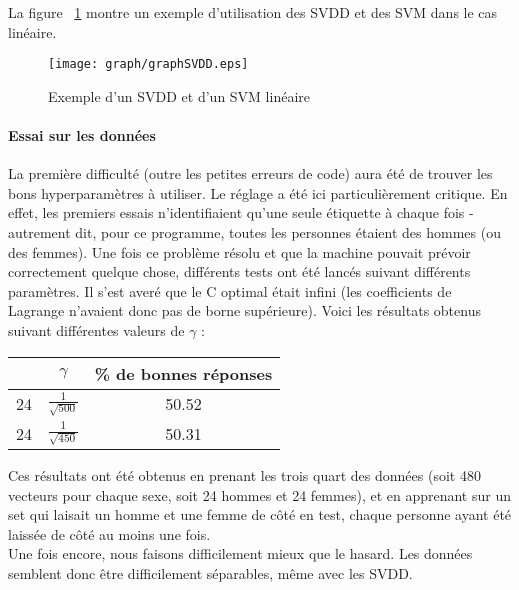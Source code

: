 La figure ~\ref{figSVDD} montre un exemple d'utilisation des SVDD et des SVM dans le cas linéaire. 

\begin{figure}[!h]
\centering
\texttt{[image: graph/graphSVDD.eps]}
\caption{Exemple d'un SVDD et d'un SVM linéaire}
\label{figSVDD}
\end{figure}

\paragraph{Essai sur les données\\}
La première difficulté (outre les petites erreurs de code) aura été de trouver les bons hyperparamètres à utiliser. Le réglage a été ici particulièrement critique. En effet, les premiers essais n'identifiaient qu'une seule étiquette à chaque fois - autrement dit, pour ce programme, toutes les personnes étaient des hommes (ou des femmes). Une fois ce problème résolu et que la machine pouvait prévoir correctement quelque chose, différents tests ont été lancés suivant différents paramètres. Il s'est averé que le C optimal était infini (les coefficients de Lagrange n'avaient donc pas de borne supérieure). Voici les résultats obtenus suivant différentes valeurs de $\gamma$ :
\begin{center}\begin{tabular}{|c|c|c|}
	\hline
	                  &        $\gamma$        & \% de bonnes réponses \\
	\hline
	24\mars 24\female & $\frac{1}{\sqrt{500}}$ &           50.52       \\
	\hline
	24\mars 24\female & $\frac{1}{\sqrt{450}}$ &           50.31       \\
	\hline
\end{tabular}\end{center}

Ces résultats ont été obtenus en prenant les trois quart des données (soit 480 vecteurs pour chaque sexe, soit 24 hommes et 24 femmes), et en apprenant sur un set qui laisait un homme et une femme de côté en test, chaque personne ayant été laissée de côté au moins une fois. \\ 
Une fois encore, nous faisons difficilement mieux que le hasard. Les données semblent donc être difficilement séparables, même avec les SVDD.
